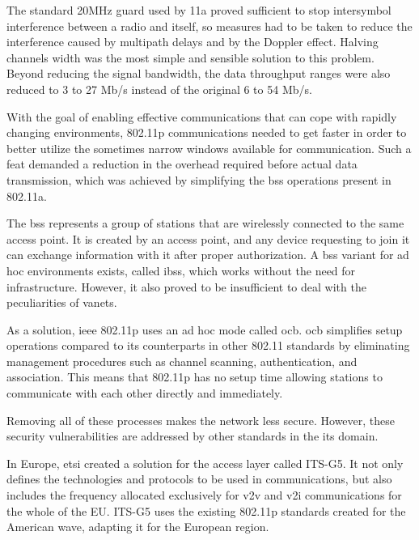 The standard 20MHz guard used by 11a proved sufficient to stop intersymbol interference between a radio and itself, so measures had to be taken to reduce the interference caused by multipath delays and by the Doppler effect. Halving channels width was the most simple and sensible solution to this problem\cite{jiang_ieee_2008}. Beyond reducing the signal bandwidth, the data throughput ranges were also reduced to 3 to 27 Mb/s instead of the original 6 to 54 Mb/s\cite{toor_vehicle_2008}.

With the goal of enabling effective communications that can cope with rapidly changing environments, 802.11p communications needed to get faster in order to better utilize the sometimes narrow windows available for communication. Such a feat demanded a reduction in the overhead required before actual data transmission, which was achieved by simplifying the \gls{bss} operations present in 802.11a\cite{jiang_ieee_2008}.

The \gls{bss} represents a group of stations that are wirelessly connected to the same access point. It is created by an access point, and any device requesting to join it can exchange information with it after proper authorization. A \gls{bss} variant for ad hoc environments exists, called \gls{ibss}, which works without the need for infrastructure. However, it also proved to be insufficient to deal with the peculiarities of \glspl{vanet}.

As a solution, \gls{ieee} 802.11p uses an ad hoc mode called \gls{ocb}. \gls{ocb} simplifies setup operations compared to its counterparts in other 802.11 standards by eliminating management procedures such as channel scanning, authentication, and association. This means that 802.11p has no setup time allowing stations to communicate with each other directly and immediately\cite{festag_cooperative_2014}.

Removing all of these processes makes the network less secure. However, these security vulnerabilities are addressed by other standards in the \gls{its} domain.

In Europe, \gls{etsi} created a solution for the access layer called ITS-G5. It not only defines the technologies and protocols to be used in communications, but also includes the frequency allocated exclusively for \gls{v2v} and \gls{v2i} communications for the whole of the EU.\cite{asselin-miller_study_2016} ITS-G5 uses the existing 802.11p standards created for the American \gls{wave}, adapting it for the European region.

